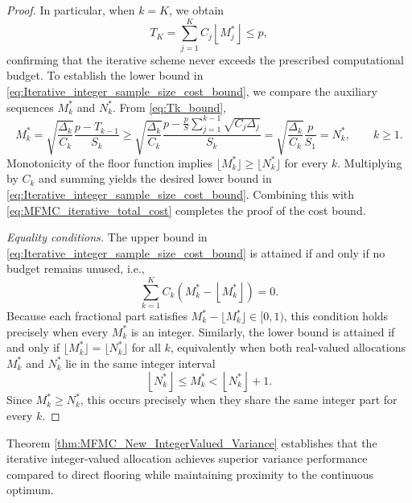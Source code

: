 \begin{proof}
In particular, when $k=K$, we obtain
\begin{equation}\label{eq:MFMC_iterative_total_cost}
T_K = \sum_{j=1}^K C_j\left\lfloor M_j^*\right\rfloor \le p,
\end{equation}
confirming that the iterative scheme never exceeds the prescribed computational budget. To establish the lower bound in \eqref{eq:Iterative_integer_sample_size_cost_bound}, we compare the auxiliary sequences $M_k^*$ and $N_k^*$. From \eqref{eq:Tk_bound},
%
\[
M_k^* = \sqrt{\frac{\Delta_k}{C_k}}\frac{p - T_{k-1}}{S_k} \ge \sqrt{\frac{\Delta_k}{C_k}}\frac{p-\frac{p}{S}\sum_{j=1}^{k-1}\sqrt{C_j\Delta_j}}{S_k} = \sqrt{\frac{\Delta_k}{C_k}}\frac{p}{S_1}=N_k^*, \qquad k \ge 1.
\]
% 
Monotonicity of the floor function implies \(\lfloor M_k^*\rfloor\ge\lfloor N_k^*\rfloor\) for every \(k\). Multiplying by \(C_k\) and summing yields the desired lower bound in 
\eqref{eq:Iterative_integer_sample_size_cost_bound}.  
Combining this with \eqref{eq:MFMC_iterative_total_cost} completes the proof of the cost bound.


\medskip
\noindent
\textit{ Equality conditions.}
The upper bound in \eqref{eq:Iterative_integer_sample_size_cost_bound} is attained if and only if no budget remains unused, i.e.,
\[
\sum_{k=1}^K C_k \left(M_k^* - \left\lfloor M_k^*\right\rfloor\right) = 0.
\]
Because each fractional part satisfies $M_k^* - \lfloor M_k^* \rfloor \in [0,1)$, this condition holds precisely when every $M_k^*$ is an integer. Similarly, the lower bound is attained if and only if \(\lfloor M_k^* \rfloor = \lfloor N_k^* \rfloor\) for all \(k\), equivalently when both real-valued allocations \(M_k^*\) and \(N_k^*\) lie in the same integer interval
%
\[
\left\lfloor N_k^*\right\rfloor\le M_k^* < \left\lfloor N_k^*\right\rfloor + 1.
\]
Since \(M_k^* \ge N_k^*\), this occurs precisely when they share the same integer part for every \(k\).

\end{proof}


Theorem \ref{thm:MFMC_New_IntegerValued_Variance} establishes that the iterative integer-valued allocation achieves superior variance performance compared to direct flooring while maintaining proximity to the continuous optimum.


